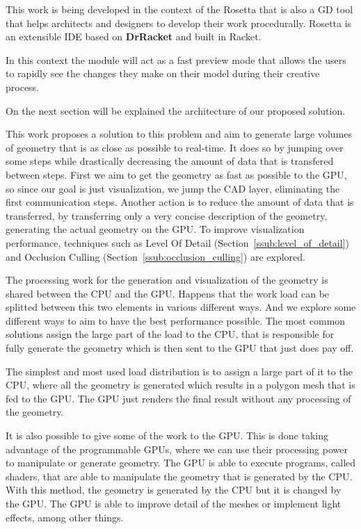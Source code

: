 This work is being developed in the context of the Rosetta that is also a GD tool that helps architects and designers to develop their work procedurally. Rosetta is an extensible IDE based on \textbf{DrRacket} and built in Racket. 

In this context the module will act as a fast preview mode that allows the users to rapidly see the changes they make on their model during their creative process.

On the next section will be explained the architecture of our proposed solution.


This work proposes a solution to this problem and aim to generate large volumes of geometry that is as close as possible to real-time. It does so by jumping over some steps while drastically decreasing the amount of data that is transfered between steps. First we aim to get the geometry as fast as possible to the GPU, so since our goal is just visualization, we jump the CAD layer, eliminating the first communication steps. Another action is to reduce the amount of data that is transferred, by transferring only a very concise description of the geometry, generating the actual geometry on the GPU.
To improve visualization performance, techniques such as Level Of Detail (Section~\ref{ssub:level_of_detail}) and Occlusion Culling (Section~\ref{ssub:occlusion_culling}) are explored.

The processing work for the generation and visualization of the geometry is shared between the \gls{CPU} and the \gls{GPU}. Happens that the work load can be splitted between this two elements in various different ways. And we explore some different ways to aim to have the best performance possible.
The most common solutions assign the large part of the load to the \gls{CPU}, that is responsible for fully generate the geometry which is then sent to the \gls{GPU} that just does pay off.

The simplest and most used load distribution is to assign a large part of it to the \gls{CPU}, where all the geometry is generated which results in a polygon mesh that is fed to the \gls{GPU}. The \gls{GPU} just renders the final result without any processing of the geometry.

It is also possible to give some of the work to the \gls{GPU}. This is done taking advantage of the programmable \gls{GPU}s, where we can use their processing power to manipulate or generate geometry. The \gls{GPU} is able to execute programs, called shaders, that are able to manipulate the geometry that is generated by the \gls{CPU}. With this method, the geometry is generated by the \gls{CPU} but it is changed by the \gls{GPU}. The \gls{GPU} is able to improve detail of the meshes or implement light effects, among other things.

